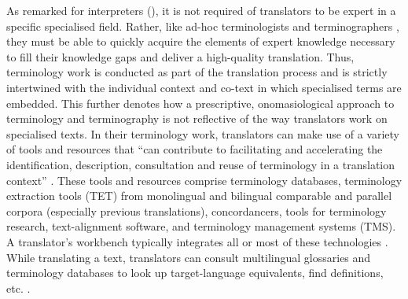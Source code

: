 As remarked for interpreters (), it is not required of translators to be expert in a specific specialised field. Rather, like ad-hoc terminologists and terminographers \citep{wright1997terminology}, they must be able to quickly acquire the elements of expert knowledge necessary to fill their knowledge gaps and deliver a high-quality translation. Thus, terminology work is conducted as part of the translation process \citep[104]{martinez2009terminological} and is strictly intertwined with the individual context and co-text in which specialised terms are embedded. This further denotes how a prescriptive, onomasiological approach to terminology and terminography is not reflective of the way translators work on specialised texts.
In their terminology work, translators can make use of a variety of tools and resources that ``can contribute to facilitating and accelerating the identification, description, consultation and reuse of terminology in a translation context'' \citep[74]{kageura2019terminology}. These tools and resources comprise terminology databases, terminology extraction tools (TET) from monolingual and bilingual comparable and parallel corpora (especially previous translations), concordancers, tools for terminology research, text-alignment software, and terminology management systems (TMS). A translator's workbench typically integrates all or most of these technologies \citep[211]{hansen2012nutzbarkeit}. While translating a text, translators can consult multilingual glossaries and terminology databases to look up target-language equivalents, find definitions, etc. \citep[4]{blancafort2011user}.

